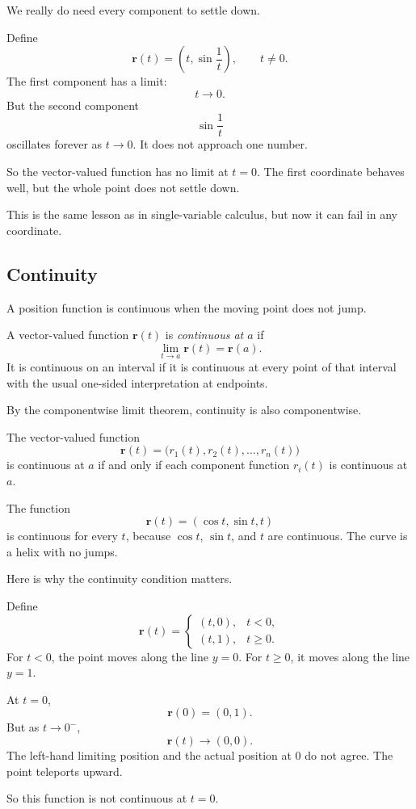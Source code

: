We really do need every component to settle down.

\begin{example}
Define
\[
    \mathbf r(t)=\left(t,\sin\frac{1}{t}\right),
    \qquad t\ne0.
\]
The first component has a limit:
\[
    t\to0.
\]
But the second component
\[
    \sin\frac{1}{t}
\]
oscillates forever as \(t\to0\).  It does not approach one number.

So the vector-valued function has no limit at \(t=0\).  The first coordinate behaves
well, but the whole point does not settle down.
\end{example}

This is the same lesson as in single-variable calculus, but now it can fail in any
coordinate.

\subsection{Continuity}

A position function is continuous when the moving point does not jump.

\begin{definition}
A vector-valued function \(\mathbf r(t)\) is \emph{continuous at \(a\)} if
\[
    \lim_{t\to a}\mathbf r(t)=\mathbf r(a).
\]
It is continuous on an interval if it is continuous at every point of that interval
with the usual one-sided interpretation at endpoints.
\end{definition}

By the componentwise limit theorem, continuity is also componentwise.

\begin{theorem}
The vector-valued function
\[
    \mathbf r(t)=\bigl(r_1(t),r_2(t),\ldots,r_n(t)\bigr)
\]
is continuous at \(a\) if and only if each component function \(r_i(t)\) is continuous
at \(a\).
\end{theorem}

\begin{example}
The function
\[
    \mathbf r(t)=(\cos t,\sin t,t)
\]
is continuous for every \(t\), because \(\cos t\), \(\sin t\), and \(t\) are continuous.
The curve is a helix with no jumps.
\end{example}

Here is why the continuity condition matters.

\begin{example}
Define
\[
    \mathbf r(t)=
    \begin{cases}
    (t,0), & t<0,\\
    (t,1), & t\ge0.
    \end{cases}
\]
For \(t<0\), the point moves along the line \(y=0\).  For \(t\ge0\), it moves along
the line \(y=1\).

At \(t=0\),
\[
    \mathbf r(0)=(0,1).
\]
But as \(t\to0^-\),
\[
    \mathbf r(t)\to(0,0).
\]
The left-hand limiting position and the actual position at \(0\) do not agree.  The
point teleports upward.

So this function is not continuous at \(t=0\).
\end{example}

